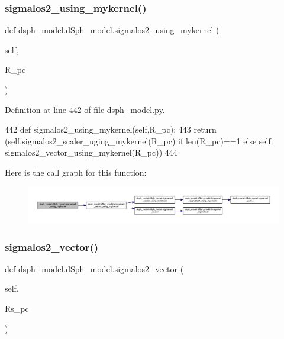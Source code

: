 \subsubsection{\texorpdfstring{sigmalos2\+\_\+using\+\_\+mykernel()}{sigmalos2\_using\_mykernel()}}
{\footnotesize\ttfamily def dsph\+\_\+model.\+d\+Sph\+\_\+model.\+sigmalos2\+\_\+using\+\_\+mykernel (\begin{DoxyParamCaption}\item[{}]{self,  }\item[{}]{R\+\_\+pc }\end{DoxyParamCaption})}



Definition at line 442 of file dsph\+\_\+model.\+py.


\begin{DoxyCode}
442     \textcolor{keyword}{def }sigmalos2\_using\_mykernel(self,R\_pc):
443         \textcolor{keywordflow}{return} (self.sigmalos2\_scaler\_uging\_mykernel(R\_pc) \textcolor{keywordflow}{if} len(R\_pc)==1 \textcolor{keywordflow}{else} self.
      sigmalos2\_vector\_using\_mykernel(R\_pc))
444     
\end{DoxyCode}
Here is the call graph for this function\+:
\nopagebreak
\begin{figure}[H]
\begin{center}
\leavevmode
\includegraphics[width=350pt]{d0/d25/classdsph__model_1_1dSph__model_a4e062f0ac546057c1109fd47ec39ed90_cgraph}
\end{center}
\end{figure}
\mbox{\label{classdsph__model_1_1dSph__model_a5170edb309402dc101ea76871645e65f}} 
\subsubsection{\texorpdfstring{sigmalos2\+\_\+vector()}{sigmalos2\_vector()}}
{\footnotesize\ttfamily def dsph\+\_\+model.\+d\+Sph\+\_\+model.\+sigmalos2\+\_\+vector (\begin{DoxyParamCaption}\item[{}]{self,  }\item[{}]{Rs\+\_\+pc }\end{DoxyParamCaption})}



